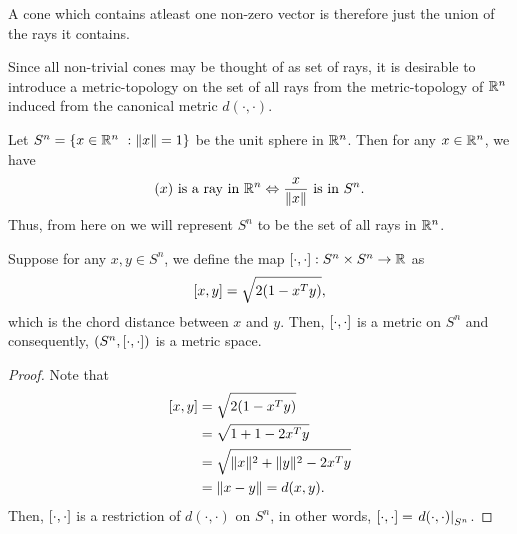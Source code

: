 \documentclass[11pt,a4paper]{article}
\begin{document}
\begin{remark}
    A cone which contains atleast one non-zero vector is therefore just the union of the rays it contains.
\end{remark}

Since all non-trivial cones may be thought of as set of rays, it is desirable to introduce a metric-topology on the set of all rays from the metric-topology of $\mathbb{R}^n$ induced from the canonical metric $d(\cdot,\cdot)$.

\begin{remark}
    Let $S^n = \{x\in \mathbb{R}^n\ : \|x\| = 1\}$ be the unit sphere in $\mathbb{R}^n$. Then for any $x\in \mathbb{R}^n$, we have
    \begin{equation*}
        (x) \text{ is a ray in } \mathbb{R}^n \Leftrightarrow \frac{x}{\|x\|} \text{ is in } S^n.
    \end{equation*}
    Thus, from here on we will represent $S^n$ to be the set of all rays in $\mathbb{R}^n$.
\end{remark}


\begin{proposition}
    Suppose for any $x,y\in S^n$, we define the map $[\cdot, \cdot]:S^n\times S^n\rightarrow \mathbb{R}$ as
    \begin{equation*}
        [x, y] = \sqrt{2(1 - x^Ty)},
    \end{equation*}
    which is the chord distance between $x$ and $y$. Then, $[\cdot, \cdot]$ is a metric on $S^n$ and consequently, $(S^n, [\cdot, \cdot])$ is a metric space.
\end{proposition}

\begin{proof}
    Note that 
    \begin{align*}
        [x, y] &= \sqrt{2(1 - x^Ty)} \\
        &= \sqrt{1 + 1 - 2x^Ty} \\
        &= \sqrt{\|x\|^2 + \|y\|^2 - 2x^Ty} \\
        &= \|x-y\| = d(x,y).
    \end{align*}
    Then, $[\cdot, \cdot]$ is a restriction of $d(\cdot,\cdot)$ on $S^n$, in other words, $[\cdot, \cdot] = \left.d(\cdot,\cdot)\right|_{S^n}$. 
\end{proof}
\end{document}
